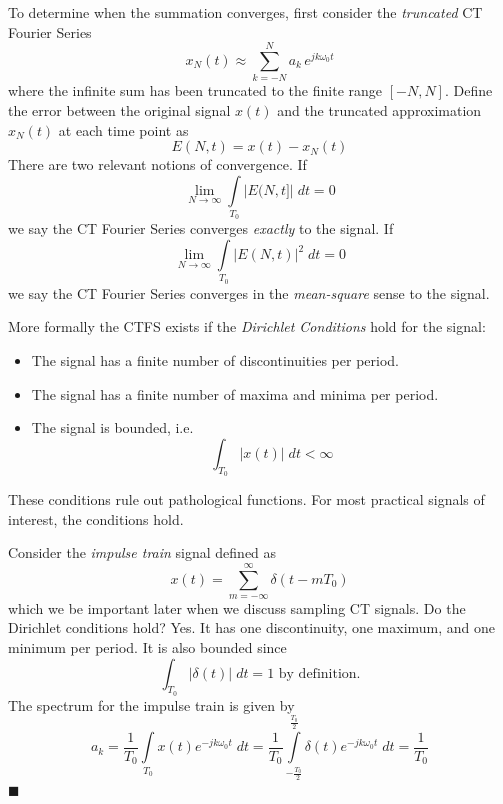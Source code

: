 To determine when the summation converges, first consider the \emph{truncated} CT Fourier Series
\[
x_N(t) \approx \sum\limits_{k = -N}^{N} a_k \, e^{j k\omega_0 t}
\]
where the infinite sum has been truncated to the finite range $[-N,N]$. Define the error between the original signal $x(t)$ and the truncated approximation $x_N(t)$ at each time point as
\[
E(N,t) = x(t) - x_N(t)
\]
There are two relevant notions of convergence. If
\[
\lim_{N\rightarrow \infty} \int\limits_{T_0} \left| E(N,t] \right|\;dt = 0
\]
we say the CT Fourier Series converges \emph{exactly} to the signal. If
\[
\lim_{N\rightarrow \infty} \int\limits_{T_0} \left| E(N,t) \right|^2\;dt = 0
\]
we say the CT Fourier Series converges in the \emph{mean-square} sense to the signal.

More formally the CTFS exists if the \emph{Dirichlet Conditions} hold for the signal:

\begin{itemize}
\item The signal has a finite number of discontinuities per period.
\item The signal has a finite number of maxima and minima per period.
\item The signal is bounded, i.e.
  \[
  \int_{T_0} |x(t)| \;dt < \infty
  \]
\end{itemize}

These conditions rule out pathological functions. For most practical signals of interest, the conditions hold.

\begin{example}
  Consider the \emph{impulse train} signal defined as
  \[
  x(t) = \sum\limits_{m = -\infty}^{\infty} \delta(t-mT_0)
  \]
  which we be important later when we discuss sampling CT signals. Do the Dirichlet conditions hold? Yes. It has one discontinuity, one maximum, and one minimum per period. It is also bounded since
  \[
  \int_{T_0} |\delta(t)| \;dt = 1 \mbox{ by definition.}
  \]
  The spectrum for the impulse train is given by
  \[
  a_k = \frac{1}{T_0} \int\limits_{T_0} x(t)e^{-jk\omega_0 t} \; dt =  \frac{1}{T_0} \int\limits_{-\frac{T_0}{2}}^{\frac{T_0}{2}} \delta(t)e^{-jk\omega_0 t} \; dt = \frac{1}{T_0}
  \]
  $\blacksquare$
\end{example}


